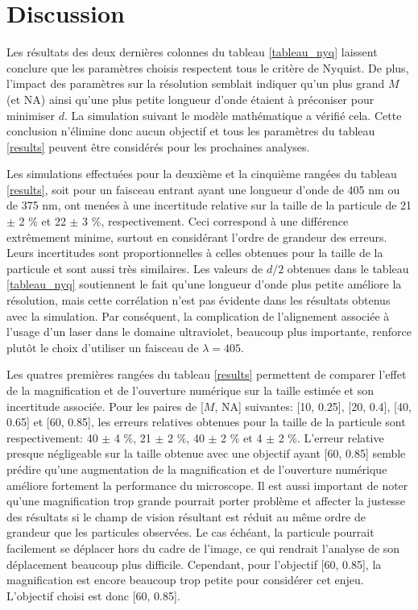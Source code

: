 \documentclass[conference]{IEEEtran}
\begin{document}
\section{Discussion}
Les résultats des deux dernières colonnes du tableau \ref{tableau_nyq} laissent conclure que les paramètres choisis respectent tous le critère de Nyquist.
De plus, l'impact des paramètres sur la résolution semblait indiquer qu'un plus grand $M$ (et NA)
ainsi qu'une plus petite longueur d'onde étaient à préconiser pour minimiser $d$. La simulation suivant
le modèle mathématique a vérifié cela. Cette conclusion n'élimine donc aucun objectif et tous les paramètres du tableau \ref{results} peuvent 
être considérés pour les prochaines analyses.

Les simulations effectuées pour la deuxième et la cinquième rangées du tableau \ref{results}, soit pour un faisceau entrant ayant une longueur d'onde de 405 nm ou de 375 nm,
ont menées à une incertitude relative sur la taille de la particule de 21 $\pm$ 2 \% et 22 $\pm$ 3 \%, respectivement. Ceci correspond à une différence extrêmement minime, surtout en 
considérant l'ordre de grandeur des erreurs. Leurs incertitudes sont proportionnelles à celles obtenues pour la taille de la particule et sont aussi très similaires. Les valeurs de $d/2$ obtenues dans le
tableau \ref{tableau_nyq} soutiennent le fait qu'une longueur d'onde plus petite améliore la résolution, mais cette corrélation n'est pas évidente dans les résultats
obtenus avec la simulation. Par conséquent, la complication de l'alignement associée à l'usage d'un laser dans le domaine ultraviolet, beaucoup plus importante, renforce plutôt le choix d'utiliser un faisceau de $\lambda=405$.

Les quatres premières rangées du tableau \ref{results} permettent de comparer l'effet de la magnification et de l'ouverture numérique sur la taille estimée et son incertitude associée. Pour les paires de [$M$, NA] 
suivantes: [10, 0.25], [20, 0.4], [40, 0.65] et [60, 0.85], les erreurs relatives obtenues pour la taille de la particule sont respectivement: 40 $\pm$ 4 \%, 21 $\pm$ 2 \%, 
40 $\pm$ 2 \% et 4 $\pm$ 2 \%. L'erreur relative presque négligeable sur la taille obtenue avec une objectif ayant [60, 0.85] semble prédire qu'une augmentation de la magnification et de l'ouverture numérique
améliore fortement la performance du microscope. Il est aussi important de noter qu'une magnification trop grande pourrait porter problème et affecter la justesse des résultats si le champ
de vision résultant est réduit au même ordre de grandeur que les particules observées. Le cas échéant, la particule pourrait facilement se déplacer hors du cadre de l'image, ce qui rendrait l'analyse de
son déplacement beaucoup plus difficile. Cependant, pour l'objectif [60, 0.85], la magnification est encore beaucoup trop petite pour considérer cet enjeu. L'objectif choisi est donc [60, 0.85].
\end{document}

